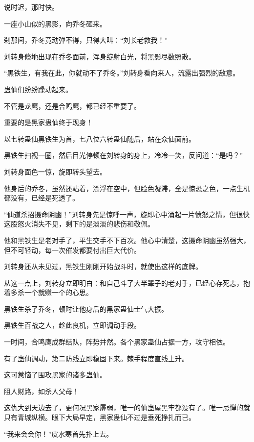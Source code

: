 
\begin{this_body}

说时迟，那时快。

一座小山似的黑影，向乔冬砸来。

刹那间，乔冬竟动弹不得，只得大叫：“刘长老救我！”

刘转身倏地出现在乔冬面前，浑身绽射白光，将黑影尽数照散。

“黑铁生，有我在此，你就动不了乔冬。”刘转身看向来人，流露出强烈的敌意。

蛊仙们纷纷躁动起来。

不管是龙鹰，还是合鸣鹰，都已经不重要了。

重要的是黑家蛊仙终于现身！

以七转蛊仙黑铁生为首，七八位六转蛊仙随后，站在众仙面前。

黑铁生扫视一圈，然后目光停顿在刘转身的身上，冷冷一笑，反问道：“是吗？”

刘转身面色一惊，旋即转头望去。

他身后的乔冬，虽然还站着，漂浮在空中，但脸色凝滞，全是惊恐之色，一点生机都没有，已经是死透了。

“仙道杀招摄命阴幽！”刘转身先是惊呼一声，旋即心中涌起一片愤怒之情，但很快这股怒火消失不见，剩下的是淡淡的悲伤和敬佩。

他和黑铁生是老对手了，平生交手不下百次。他心中清楚，这摄命阴幽虽然强大，但不可轻动，每一次催发都要付出巨大代价。

刘转身还从未见过，黑铁生刚刚开始战斗时，就使出这样的底牌。

从这一点上，刘转身立即明白：和自己斗了大半辈子的老对手，已经心存死志，抱着多杀一个就赚一个的心思。

黑铁生杀了乔冬，顿时让他身后的黑家蛊仙士气大振。

黑铁生百战之人，趁此良机，立即调动手段。

一时间，合鸣鹰成群结队，阵势井然。各个黑家蛊仙占据一方，攻守相依。

有了蛊仙调动，第二防线立即稳固下来。棘手程度直线上升。

这可惹恼了围攻黑家的诸多蛊仙。

阻人财路，如杀人父母！

这仇大到天边去了，更何况黑家孱弱，唯一的仙蛊屋黑牢都没有了。唯一忌惮的就只有青城纵横。眼下大局早定，黑家蛊仙不过是垂死挣扎而已。

“我来会会你！”皮水寒首先扑上去。


\end{this_body}
